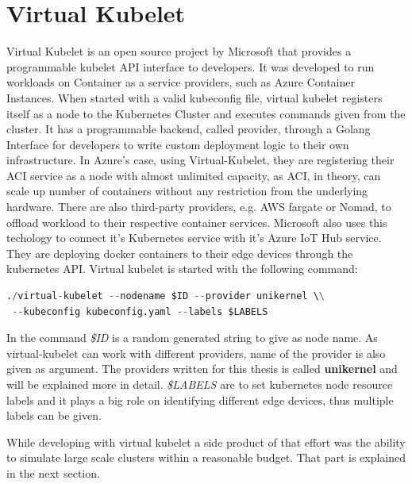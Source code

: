 \section{Virtual Kubelet}
Virtual Kubelet\cite{virtual} is an open source project by Microsoft that provides a programmable kubelet API interface to developers. It was developed to run workloads on Container as a service providers, such as Azure Container Instances. When started with a valid kubeconfig file, virtual kubelet registers itself as a node to the Kubernetes Cluster and executes commands given from the cluster. It has a programmable backend, called provider, through a Golang Interface for developers to write custom deployment logic to their own infrastructure. In Azure's case, using Virtual-Kubelet, they are registering their ACI service as a node with almost unlimited capacity, as ACI, in theory, can scale up number of containers without any restriction from the underlying hardware. There are also third-party providers, e.g. AWS fargate or Nomad, to offload workload to their respective container services. Microsoft also uses this techology to connect it's Kubernetes service with it's Azure IoT Hub service.\cite{Chandra2019} They are deploying docker containers to their edge devices through the kubernetes API. Virtual kubelet is started with the following command:

\begin{lstlisting}[language=python,caption={Command to run Virtual Kubelet},captionpos={b},label={lst:vkcommand}]
./virtual-kubelet --nodename $ID --provider unikernel \\
 --kubeconfig kubeconfig.yaml --labels $LABELS
\end{lstlisting}

In the command \textit{\$ID} is a random generated string to give as node name. As virtual-kubelet can work with different providers, name of the provider is also given as argument. The providers written for this thesis is called \textbf{unikernel} and will be explained more in detail. \textit{\$LABELS} are to set kubernetes node resource labels and it plays a big role on identifying different edge devices, thus multiple labels can be given.

While developing with virtual kubelet a side product of that effort was the ability to simulate large scale clusters within a reasonable budget. That part is explained in the next section.
